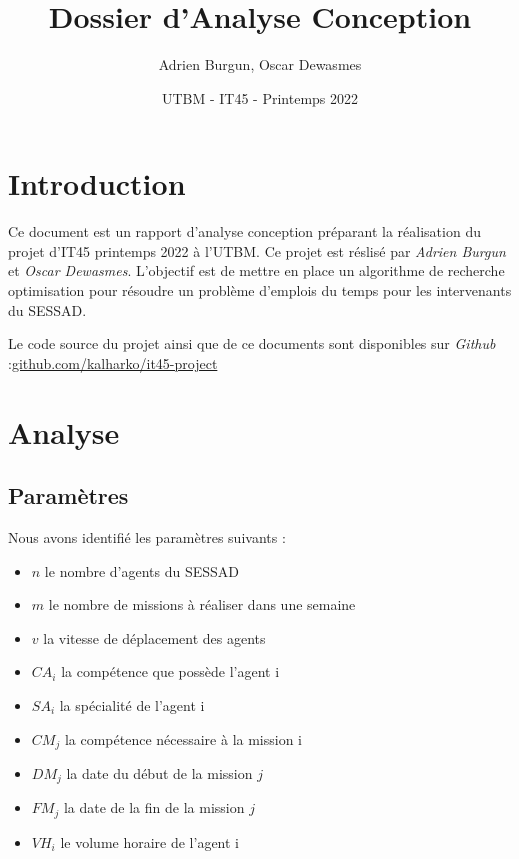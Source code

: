 \documentclass[11pt]{article}
\title{\textbf{Dossier d'Analyse Conception}}
\author{Adrien Burgun, Oscar Dewasmes}
\date{UTBM - IT45 - Printemps 2022} %
\begin{document}
\maketitle


\newpage
\tableofcontents


\newpage
\section{Introduction}

Ce document est un rapport d'analyse conception préparant la réalisation du projet d'IT45 printemps 2022 à l'UTBM. Ce projet est réslisé par \emph{Adrien Burgun} et \emph{Oscar Dewasmes}. L'objectif est de mettre en place un algorithme de recherche optimisation pour résoudre un problème d'emplois du temps pour les intervenants du SESSAD.

Le code source du projet ainsi que de ce documents sont disponibles sur \emph{Github} :\newline \href{https://github.com/kalharko/it45-project}{github.com/kalharko/it45-project}


\newpage
\section{Analyse}


\subsection{Paramètres}


Nous avons identifié les paramètres suivants :
\begin{itemize}
    \item $n$ \tabto{2cm} le nombre d'agents du SESSAD
    \item $m$ \tabto{2cm} le nombre de missions à réaliser dans une semaine
    \item $v$ \tabto{2cm} la vitesse de déplacement des agents
    \item $CA_i$ \tabto{2cm} la compétence que possède l'agent i
    \item $SA_i$ \tabto{2cm} la spécialité de l'agent i
    \item $CM_j$ \tabto{2cm} la compétence nécessaire à la mission i
    \item $DM_j$ \tabto{2cm} la date du début de la mission $j$
    \item $FM_j$ \tabto{2cm} la date de la fin de la mission $j$
    \item $VH_i$ \tabto{2cm} le volume horaire de l'agent i
\end{itemize}
\end{document}
